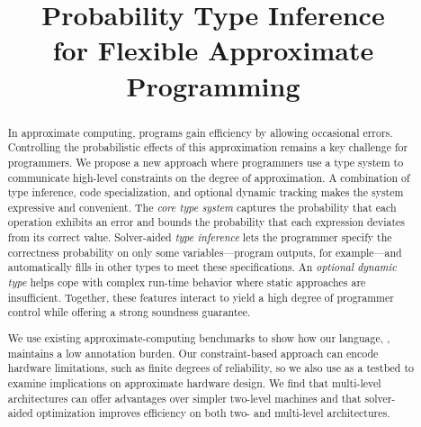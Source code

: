 \documentclass[10pt,nocopyrightspace,preprint]{sigplanconf}
\begin{document}

\title{Probability Type Inference \\ for Flexible Approximate Programming}

\authorinfo{}{}{}


\maketitle

\begin{abstract}
    In approximate computing, programs gain efficiency by allowing occasional
    errors.
    Controlling the probabilistic effects of this approximation remains a key
    challenge for programmers.
    We propose a new approach where programmers use a type system to
    communicate high-level constraints on the degree of approximation.
    A combination of type inference, code specialization, and optional dynamic
    tracking makes the system expressive and convenient.
    The \emph{core type system} captures the probability that each operation exhibits
    an error and bounds the probability that each expression deviates from its
    correct value.
    Solver-aided \emph{type inference} lets the programmer specify the correctness
    probability on only some variables---program outputs, for example---and
    automatically fills in other types to meet these
    specifications.
    An \emph{optional dynamic type} helps cope with complex run-time behavior where
    static approaches are insufficient.
    Together, these features interact to yield a high degree of programmer
    control while offering a strong soundness guarantee.

    We use existing approximate-computing benchmarks to show how our language,
    \lang, maintains a low annotation burden.
    Our constraint-based approach can encode hardware limitations, such as
    finite degrees of reliability, so
    we also use \lang as a testbed to examine implications on approximate hardware
    design.
    We find that multi-level architectures can
    offer advantages over simpler two-level machines and
    that
    solver-aided optimization improves efficiency on both two- and
    multi-level architectures.
\end{abstract}
\end{document}
